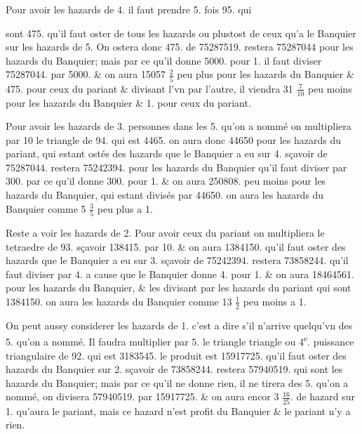 \documentclass[11pt,a4paper]{article}
\begin{document}
Pour avoir les hazards de 4. il faut prendre 5. fois 95. qui


sont 475.  qu'il  faut oster de tous les hazards ou plustost de ceux qu'a le Banquier sur les hazards de 5. On ostera donc 475. de 75287519. restera 75287044 pour les hazards du Banquier; mais par ce qu'il donne 5000. pour 1. il faut diviser 75287044. par 5000. \& on aura 15057 $\frac{2}{5}$ peu plus pour les hazards du Banquier \& 475. pour ceux du pariant \& divisant l'vn par l'autre, il viendra 31 $\frac{7}{10}$ peu moins pour les hazards du Banquier \& 1. pour ceux du pariant.

Pour avoir les hazards de 3. personnes dans les 5. qu'on a nommé on multipliera par 10 le triangle de 94. qui est 4465. on aura donc 44650 pour les hazards du pariant, qui estant ostés des hazards que le Banquier a eu sur 4. sçavoir de 75287044. restera 75242394. pour les hazards du Banquier qu'il faut diviser par 300. par ce qu'il donne 300. pour 1. \& on aura 250808. peu moins pour les hazards du Banquier, qui estant divisés par 44650. on aura les hazards du Banquier comme 5 $\frac{3}{5}$ peu plus a 1.

Reste a voir les hazards de 2. Pour avoir ceux du pariant on multipliera le tetraedre de 93. sçavoir 138415. par 10. \& on aura 1384150. qu'il faut oster des hazards que le Banquier a eu sur 3. sçavoir de 75242394. restera 73858244. qu'il faut diviser par 4. a cause que le Banquier donne 4. pour 1. \& on aura 18464561. pour les hazards du Banquier, \& les divisant par les hazards du pariant qui sont 1384150. on aura les hazards du Banquier comme 13 $\frac{1}{2}$ peu moins a 1.

On peut aussy considerer les hazards de 1. c'est a dire s'il n'arrive quelqu'vn des 5. qu'on a nommé. Il faudra multiplier par 5. le triangle triangle ou 4\textsuperscript{e}. puissance triangulaire de 92. qui est 3183545. le produit est 15917725. qu'il faut oster des hazards du Banquier sur 2. sçavoir de 73858244. restera 57940519. qui sont les hazards du Banquier; mais par ce qu'il ne donne rien,   il ne tirera \struck{\ill{}}  des 5. qu'on a \struck{\ill{}} nommé, on \struck{\ill{}} divisera  57940519. par 15917725. \& on aura encor 3 $\frac{16}{25}$. de hazard sur 1. qu'aura le pariant, mais ce hazard n'est  \struck{\ill{}} profit du Banquier \& le pariant n'y a rien.
\end{document}
